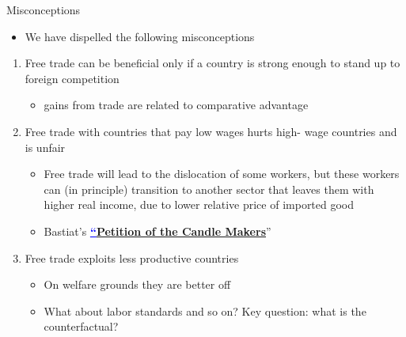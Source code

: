 \documentclass[10pt,hyperref={CJKbookmarks=true},xcolor=dvipsnames,aspectratio=169]{beamer}
\begin{document}
\begin{frame}{Misconceptions}

\begin{itemize}
\item We have dispelled the following misconceptions \end{itemize}
\begin{enumerate}
\item Free trade can be beneficial only if a country is strong enough to
stand up to foreign competition 

\begin{itemize}
\item gains from trade are related to comparative advantage 
\end{itemize}
\item Free trade with countries that pay low wages hurts high- wage countries
and is unfair 

\begin{itemize}
\item Free trade will lead to the dislocation of some workers, but these
workers can (in principle) transition to another sector that leaves
them with higher real income, due to lower relative price of imported
good 
\item Bastiat’s \textbf{\textcolor{blue}{\uline{“\href{http://bastiat.org/en/petition.html}{Petition of the Candle Makers}}}}” 
\end{itemize}
\item Free trade exploits less productive countries 

\begin{itemize}
\item On welfare grounds they are better off 
\item What about labor standards and so on? Key question: what is the counterfactual? 
\end{itemize}
\end{enumerate}
\end{frame}
\end{document}
